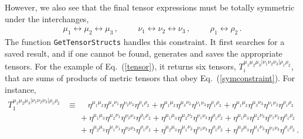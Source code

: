 \documentclass[aps,prd,preprint,eqsecnum,tightenlines,nofootinbib,showpacs]{revtex4}
\def\eqn#1{Eq.~({\ref{#1}})}
\begin{document}
However, we also see that the final tensor expressions must be totally symmetric under 
the interchanges,
%
\begin{align}
\mu_{1}\leftrightarrow\mu_{2}\leftrightarrow\mu_{3}\,, \hspace{1cm}
\nu_{1}\leftrightarrow\nu_{2}\leftrightarrow\nu_{3}\,,\hspace{1cm}
\rho_{1}\leftrightarrow\rho_{2}\,.
\label{symconstraint}
\end{align}
%
The function \texttt{GetTensorStructs} handles this constraint. It first searches for a
saved result, and if one cannot be found, generates and saves the appropriate tensors.
For the example of \eqn{tensor}, it returns six tensors, 
$T_{i}^{\mu_{1}\mu_{2}\mu_{3}|\nu_{1}\nu_{2}\nu_{3}|\rho_{1}\rho_{2}}$,
that are sums of products of metric tensors that obey \eqn{symconstraint}.
For instance,
%
\begin{align}
T_{1}^{\mu_{1}\mu_{2}\mu_{3}|\nu_{1}\nu_{2}\nu_{3}|\rho_{1}\rho_{2}} &\equiv
\phantom{+}\eta^{\mu_{1}\mu_{2}}\eta^{\mu_{3}\nu_{1}}\eta^{\nu_{2}\nu_{3}}\eta^{\rho_{1}\rho_{2}}
+ \eta^{\mu_{1}\mu_{2}}\eta^{\mu_{3}\nu_{2}}\eta^{\nu_{1}\nu_{3}}\eta^{\rho_{1}\rho_{2}}
+ \eta^{\mu_{1}\mu_{2}}\eta^{\mu_{3}\nu_{3}}\eta^{\nu_{1}\nu_{2}}\eta^{\rho_{1}\rho_{2}}
\nonumber\\ &\phantom{\equiv\, } +
\eta^{\mu_{1}\mu_{3}}\eta^{\mu_{2}\nu_{1}}\eta^{\nu_{2}\nu_{3}}\eta^{\rho_{1}\rho_{2}}
+ \eta^{\mu_{1}\mu_{3}}\eta^{\mu_{2}\nu_{2}}\eta^{\nu_{1}\nu_{3}}\eta^{\rho_{1}\rho_{2}}
+ \eta^{\mu_{1}\mu_{3}}\eta^{\mu_{2}\nu_{3}}\eta^{\nu_{1}\nu_{2}}\eta^{\rho_{1}\rho_{2}}
\nonumber\\ &\phantom{\equiv\, } +
\eta^{\mu_{2}\mu_{3}}\eta^{\mu_{1}\nu_{1}}\eta^{\nu_{2}\nu_{3}}\eta^{\rho_{1}\rho_{2}}
+ \eta^{\mu_{2}\mu_{3}}\eta^{\mu_{1}\nu_{2}}\eta^{\nu_{1}\nu_{3}}\eta^{\rho_{1}\rho_{2}}
+ \eta^{\mu_{2}\mu_{3}}\eta^{\mu_{1}\nu_{3}}\eta^{\nu_{1}\nu_{3}}\eta^{\rho_{1}\rho_{2}}
\,.
\label{T1}
\end{align}
%
\end{document}
